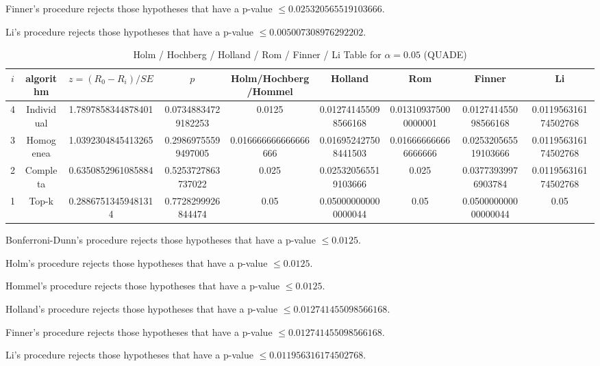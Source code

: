 \documentclass[a4paper,10pt]{article}
\begin{document}
\begin{landscape}
Finner's procedure rejects those hypotheses that have a p-value $\le0.025320565519103666$.


Li's procedure rejects those hypotheses that have a p-value $\le0.005007308976292202$.



\newpage

\begin{table}[!htp]
\centering\scriptsize
\caption{Holm / Hochberg / Holland / Rom / Finner / Li Table for $\alpha=0.05$ (QUADE)}
\begin{tabular}{ccccccccc}
$i$&algorithm&$z=(R_0 - R_i)/SE$&$p$&Holm/Hochberg/Hommel&Holland&Rom&Finner&Li\\
\hline
4&Individual&1.7897858344878401&0.07348834729182253&0.0125&0.012741455098566168&0.013109375000000001&0.012741455098566168&0.011956316174502768\\
3&Homogenea&1.0392304845413265&0.29869755599497005&0.016666666666666666&0.016952427508441503&0.016666666666666666&0.025320565519103666&0.011956316174502768\\
2&Completa&0.6350852961085884&0.5253727863737022&0.025&0.025320565519103666&0.025&0.03773939976903784&0.011956316174502768\\
1&Top-k&0.28867513459481314&0.7728299926844474&0.05&0.050000000000000044&0.05&0.050000000000000044&0.05\\
\hline
\end{tabular}
\end{table}
Bonferroni-Dunn's procedure rejects those hypotheses that have a p-value $\le0.0125$.


Holm's procedure rejects those hypotheses that have a p-value $\le0.0125$.


Hommel's procedure rejects those hypotheses that have a p-value $\le0.0125$.


Holland's procedure rejects those hypotheses that have a p-value $\le0.012741455098566168$.


Finner's procedure rejects those hypotheses that have a p-value $\le0.012741455098566168$.


Li's procedure rejects those hypotheses that have a p-value $\le0.011956316174502768$.



\newpage


\end{landscape}
\end{document}
